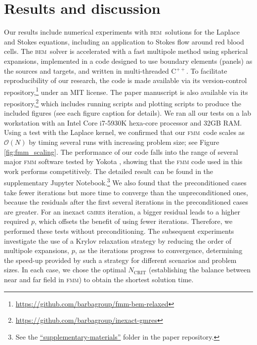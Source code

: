 \documentclass[smallcondensed,final]{svjour3}
\newcommand{\bem}{\textsc{bem}\xspace}
\newcommand{\fmm}{\textsc{fmm}\xspace}
\newcommand{\cpp}{C$^{++}$}
\renewcommand{\O}[1]{\mathcal{O}(#1)}
\newcommand{\ncrit}{N_{\text{CRIT}}}
\newcommand{\gmres}{\textsc{gmres}\xspace}
\begin{document}
\section{Results and discussion}
Our results include numerical experiments with \bem\ solutions for the Laplace and Stokes equations, including an application to Stokes flow around red blood cells. The \bem\ solver is accelerated with a fast multipole method using spherical expansions, implemented in a code designed to use boundary elements (panels) as the sources and targets, and written in multi-threaded \cpp. To facilitate reproducibility of our research, the code is made available via its version-control repository,\footnote{\href{https://github.com/barbagroup/fmm-bem-relaxed}{https://github.com/barbagroup/fmm-bem-relaxed}} under an MIT license. The paper manuscript is also available via its repository,\footnote{\href{https://github.com/barbagroup/inexact-gmres}{https://github.com/barbagroup/inexact-gmres}} which includes running scripts and plotting scripts to produce the included figures (see each figure caption for details).
We ran all our tests on a lab workstation with an Intel Core i7-5930K hexa-core processor and 32GB RAM. Using a test with the Laplace kernel, we confirmed that our \fmm\ code scales as $\O{N}$ by timing several runs with increasing problem size; see Figure \ref{fig:fmm_scaling}. The performance of our code falls into the range of several major \fmm software tested by Yokota \cite{Yokota2013-dualtree}, showing that the \fmm code used in this work performs competitively. The detailed result can be found in the supplementary Jupyter Notebook.\footnote{See the \href{https://github.com/barbagroup/inexact-gmres/blob/master/supplementary-materials/inexact-GMRES-result.ipynb}{``supplementary-materials''} folder in the paper repository.} We also found that the preconditioned cases take fewer iterations but more time to converge than the unpreconditioned ones, because the residuals after the first several iterations in the preconditioned cases are greater. For an inexact {\gmres} iteration, a bigger residual leads to a higher required $p$, which offsets the benefit of using fewer iterations. Therefore, we performed these tests without preconditioning.
The subsequent experiments investigate the use of a Krylov relaxation strategy by reducing the order of multipole expansions, $p$, as the iterations progress to convergence, determining the speed-up provided by such a strategy for different scenarios and problem sizes.
In each case, we chose the optimal $\ncrit$ (establishing the balance between near and far field in \fmm) to obtain the shortest solution time.
\end{document}
